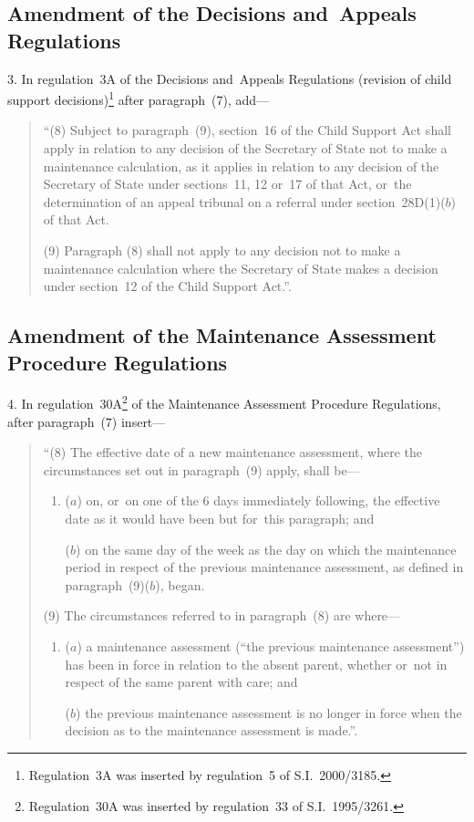 \documentclass[12pt,a4paper]{article}
\begin{document}
\subsection[3. Amendment of the Decisions and~Appeals Regulations]{Amendment of the Decisions and~Appeals Regulations}

3.  In regulation~3A of the Decisions and~Appeals Regulations (revision of child support decisions)\footnote{Regulation~3A was inserted by regulation~5 of S.I.~2000/3185.} after paragraph~(7), add—
\begin{quotation}
“(8) Subject to paragraph~(9), section~16 of the Child Support Act shall apply in relation to any decision of the Secretary of State not to make a maintenance calculation, as it applies in relation to any decision of the Secretary of State under sections~11, 12 or~17 of that Act, or~the determination of an appeal tribunal on a referral under section~28D(1)($b$)  of that Act.

(9) Paragraph (8) shall not apply to any decision not to make a maintenance calculation where the Secretary of State makes a decision under section~12 of the Child Support Act.”.
\end{quotation}

\subsection[4. Amendment of the Maintenance Assessment Procedure Regulations]{Amendment of the Maintenance Assessment Procedure Regulations}

4.  In regulation~30A\footnote{Regulation~30A was inserted by regulation~33 of S.I.~1995/3261.} of the Maintenance Assessment Procedure Regulations, after paragraph~(7) insert—
\begin{quotation}
“(8) The effective date of a new maintenance assessment, where the circumstances set out in paragraph~(9) apply, shall be—
\begin{enumerate}\item[]
($a$) on, or~on one of the 6 days immediately following, the effective date as it would have been but for~this paragraph; and

($b$) on the same day of the week as the day on which the maintenance period in respect of the previous maintenance assessment, as defined in paragraph~(9)($b$), began.
\end{enumerate}

(9) The circumstances referred to in paragraph~(8) are where—
\begin{enumerate}\item[]
($a$) a maintenance assessment (“the previous maintenance assessment”) has been in force in relation to the absent parent, whether or~not in respect of the same parent with care; and

($b$) the previous maintenance assessment is no longer in force when the decision as to the maintenance assessment is made.”.
\end{enumerate}
\end{quotation}
\end{document}
